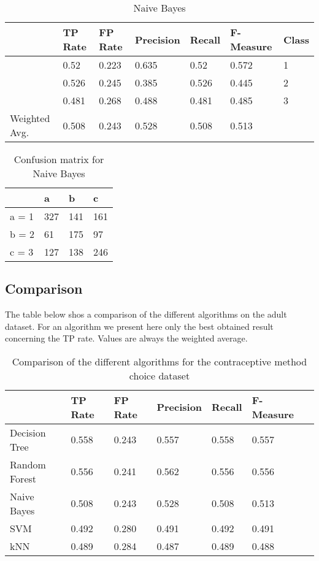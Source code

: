 \documentclass[paper=a4, fontsize=11pt]{scrartcl} %
\numberwithin{equation}{section} %
\numberwithin{figure}{section} %
\numberwithin{table}{section} %
\begin{document}
\begin{table*}[htb]\centering
  \begin{tabular*}{\columnwidth}{@{}lllllll@{}}
      \toprule 
               &  TP Rate & FP Rate & Precision & Recall & F-Measure & Class \\   \midrule
               &  0.52    & 0.223   & 0.635     & 0.52   & 0.572     & 1  \\  
               &  0.526   & 0.245   & 0.385     & 0.526  & 0.445     & 2  \\
               &  0.481   & 0.268   & 0.488     & 0.481  & 0.485     & 3  \\
Weighted Avg.  &  0.508   & 0.243   & 0.528     & 0.508  & 0.513     &    \\   \bottomrule
    \end{tabular*}
\caption{Naive Bayes} 
\label{tab:contra:bayes:1d}
\end{table*}



\begin{table}[h]
\centering
\begin{tabular}{|l|lll|}
\hline
              &   a &   b &   c  \\
\hline
 a = 1        & 327 & 141 & 161  \\
 b = 2        &  61 & 175 &  97  \\
 c = 3        & 127 & 138 & 246  \\
\hline
\end{tabular}
\caption{Confusion matrix for Naive Bayes}
\label{tab:contra:bayes:1c}
\end{table}



\subsection{Comparison}

The table below shos a comparison of the different algorithms on the adult dataset. For an algorithm we present here only the best obtained result concerning the TP rate. Values are always the weighted average.

\begin{table}[h]
\centering
\begin{tabular}{lllllll}
	\toprule
									&TP Rate   	&FP Rate   &Precision &Recall  &F-Measure   \\
	\midrule
	Decision Tree 	&  0.558   & 0.243   & 0.557     	& 0.558  & 0.557     \\
  Random Forest		&  0.556   & 0.241   & 0.562     	& 0.556  & 0.556     \\
  Naive Bayes		 	&  0.508   & 0.243   & 0.528     	& 0.508  & 0.513 \\
  SVM							& 0.492    &0.280     &0.491     	&0.492   & 0.491 		 \\
  kNN							&0.489     &0.284    &0.487     	& 0.489  & 0.488 		 \\
	\bottomrule
\end{tabular}
\caption{Comparison of the different algorithms for the contraceptive method choice dataset}
\end{table}

\end{document}
